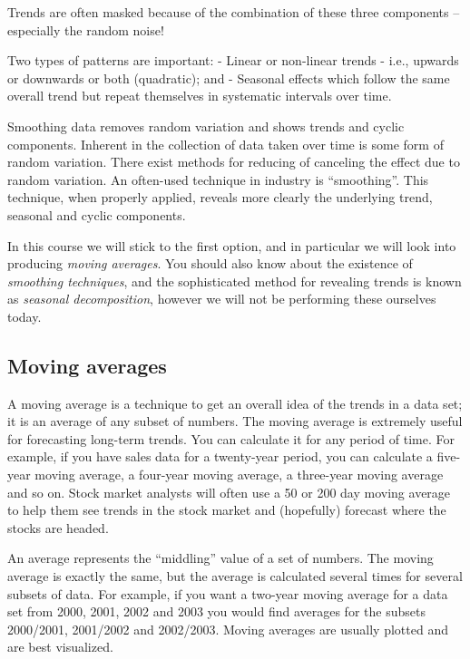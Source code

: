\documentclass[]{book}
\theoremstyle{definition}
\theoremstyle{definition}
\theoremstyle{definition}
\theoremstyle{remark}
\begin{document}
Trends are often masked because of the combination of these three
components -- especially the random noise!

Two types of patterns are important: - Linear or non-linear trends -
i.e., upwards or downwards or both (quadratic); and - Seasonal effects
which follow the same overall trend but repeat themselves in systematic
intervals over time.

Smoothing data removes random variation and shows trends and cyclic
components. Inherent in the collection of data taken over time is some
form of random variation. There exist methods for reducing of canceling
the effect due to random variation. An often-used technique in industry
is ``smoothing''. This technique, when properly applied, reveals more
clearly the underlying trend, seasonal and cyclic components.

In this course we will stick to the first option, and in particular we
will look into producing \emph{moving averages}. You should also know
about the existence of \emph{smoothing techniques}, and the
sophisticated method for revealing trends is known as \emph{seasonal
decomposition}, however we will not be performing these ourselves today.

\hypertarget{moving-averages}{%
\subsection{Moving averages}\label{moving-averages}}

A moving average is a technique to get an overall idea of the trends in
a data set; it is an average of any subset of numbers. The moving
average is extremely useful for forecasting long-term trends. You can
calculate it for any period of time. For example, if you have sales data
for a twenty-year period, you can calculate a five-year moving average,
a four-year moving average, a three-year moving average and so on. Stock
market analysts will often use a 50 or 200 day moving average to help
them see trends in the stock market and (hopefully) forecast where the
stocks are headed.

An average represents the ``middling'' value of a set of numbers. The
moving average is exactly the same, but the average is calculated
several times for several subsets of data. For example, if you want a
two-year moving average for a data set from 2000, 2001, 2002 and 2003
you would find averages for the subsets 2000/2001, 2001/2002 and
2002/2003. Moving averages are usually plotted and are best visualized.
\end{document}
